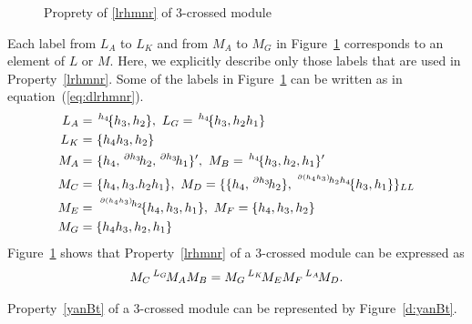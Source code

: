 \documentclass{tac}
\newcommand{\act}[1]{\,\sp{#1}\!}
\newcommand{\del}{\partial}
\begin{document}
\begin{appendices}
\begin{figure}[htbp]
\begin{center}
{
  }
\end{center}
\caption{Proprety of \ref{lrhmnr} of 3-crossed module}
\label{dlrhmnr}
\end{figure}

Each label from $L_A$ to $L_K$ and from $M_A$ to $M_G$ in Figure~\ref{dlrhmnr} corresponds to an element of $L$ or $M$. Here, we explicitly describe only those labels that are used in Property~\ref{lrhmnr}. Some of the labels in Figure~\ref{dlrhmnr} can be written as in equation~(\ref{eq:dlrhmnr}).
\begin{equation}
\label{eq:dlrhmnr}
    \begin{aligned}
L_A &= \act{h_4}\{h_3, h_2\}, \ 
L_G = \act{h_4}\{h_3, h_2h_1\} \\
L_K &= \act{}\{h_4h_3,h_2\} \\ 
M_A &= \act{}\{h_4, \act{\del h_3}h_2, \act{\del h_3}h_1\}', \ 
M_B =\act{h_4}\{h_3, h_2, h_1\}'\\
M_C &= \act{}\{h_4,h_3.h_2h_1\}, \ 
M_D = \{ \{h_4,\act{\del h_3}h_2\}, \act{\act{\del(h_4h_3)}h_2h_4}\{h_3,h_1\}\}_{LL}\\
M_E &=\act{\act{\del(h_4h_3)}h_2}\{h_4,h_3,h_1\}, \ 
M_F =\{h_4, h_3,h_2\}\\
M_G&=\{h_4h_3, h_2,h_1\}
\end{aligned}
\end{equation}
Figure~\ref{dlrhmnr} shows that Property~\ref{lrhmnr} of a 3-crossed module can be expressed as 
\[
M_C \act{L_G}M_A M_B = M_G \act{L_K}M_E M_F \act{L_A}M_D.
\]

Property~\ref{yanBt} of a 3-crossed module can be represented by Figure~\ref{d:yanBt}.




\end{appendices}
\end{document}
